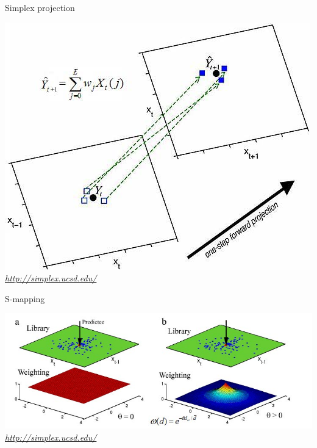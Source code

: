 \documentclass[10pt]{beamer}
\begin{document}
		\begin{frame}{Simplex projection}
			\begin{center}
				\includegraphics[width=\textwidth,height=0.75\textheight,keepaspectratio=true]{images/simplex.jpg}
				\\
				{\it \small \url{http://simplex.ucsd.edu/} }
			\end{center}
		\end{frame}

		\begin{frame}{S-mapping}
			\begin{center}
				\includegraphics[width=\textwidth,height=0.75\textheight,keepaspectratio=true]{images/smap.jpg}
				\\
				{\it \small \url{http://simplex.ucsd.edu/} }
			\end{center}
		\end{frame}
\end{document}
